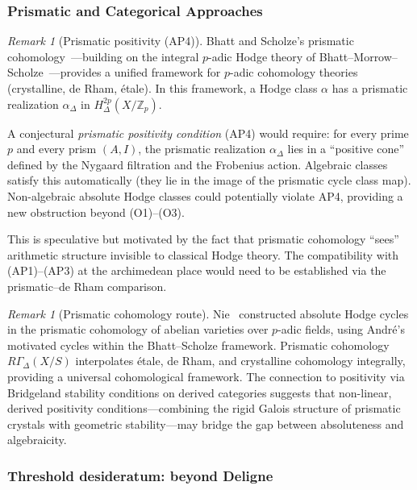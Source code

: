 \documentclass[aps,prd,twocolumn,superscriptaddress,nofootinbib]{revtex4-2}
\theoremstyle{definition}
\theoremstyle{remark}
\newtheorem{remark}[theorem]{Remark}
\begin{document}
\subsubsection{Prismatic and Categorical Approaches}

\begin{remark}[Prismatic positivity (AP4)]
\label{rem:prismatic}
Bhatt and Scholze's prismatic cohomology~\cite{BhattScholze2022}---building on the integral $p$-adic Hodge theory of Bhatt--Morrow--Scholze~\cite{BhattMorrowScholze2018}---provides a unified framework for $p$-adic cohomology theories (crystalline, de Rham, \'etale). In this framework, a Hodge class $\alpha$ has a prismatic realization $\alpha_{\Delta}$ in $H^{2p}_{\Delta}(X/\mathbb{Z}_p)$.

A conjectural \textit{prismatic positivity condition} (AP4) would require: for every prime $p$ and every prism $(A, I)$, the prismatic realization $\alpha_{\Delta}$ lies in a ``positive cone'' defined by the Nygaard filtration and the Frobenius action. Algebraic classes satisfy this automatically (they lie in the image of the prismatic cycle class map). Non-algebraic absolute Hodge classes could potentially violate AP4, providing a new obstruction beyond (O1)--(O3).

This is speculative but motivated by the fact that prismatic cohomology ``sees'' arithmetic structure invisible to classical Hodge theory. The compatibility with (AP1)--(AP3) at the archimedean place would need to be established via the prismatic--de Rham comparison.
\end{remark}

\begin{remark}[Prismatic cohomology route]\label{rem:prismatic-route}
Nie~\cite{Nie2021} constructed absolute Hodge cycles in the prismatic cohomology of abelian varieties over $p$-adic fields, using André's motivated cycles within the Bhatt--Scholze framework. Prismatic cohomology $R\Gamma_\Delta(X/S)$ interpolates \'etale, de Rham, and crystalline cohomology integrally, providing a universal cohomological framework. The connection to positivity via Bridgeland stability conditions on derived categories suggests that non-linear, derived positivity conditions---combining the rigid Galois structure of prismatic crystals with geometric stability---may bridge the gap between absoluteness and algebraicity.
\end{remark}

\subsubsection*{Threshold desideratum: beyond Deligne}
\end{document}
